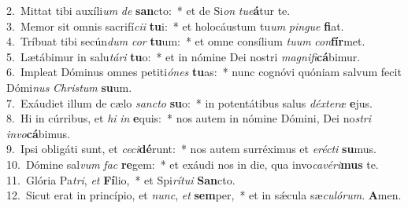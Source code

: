 {2.~}Mittat tibi auxíli\textit{um} \textit{de} \textbf{san}cto:~* et de Si\textit{on} \textit{tu}\textit{e}\textbf{á}tur te.\\
{3.~}Memor sit omnis sacrifí\textit{ci}\textit{i} \textbf{tu}i:~* et holocáustum tu\textit{um} \textit{pin}\textit{gue} \textbf{fi}at.\\
{4.~}Tríbuat tibi secún\textit{dum} \textit{cor} \textbf{tu}um:~* et omne consílium \textit{tu}\textit{um} \textit{con}\textbf{fír}met.\\
{5.~}Lætábimur in salu\textit{tá}\textit{ri} \textbf{tu}o:~* et in nómine Dei nostri \textit{ma}\textit{gni}\textit{fi}\textbf{cá}bimur.\\
{6.~}Impleat Dóminus omnes petiti\textit{ó}\textit{nes} \textbf{tu}as:~* nunc cognóvi quóniam salvum fecit Dómi\textit{nus} \textit{Chri}\textit{stum} \textbf{su}um.\\
{7.~}Exáudiet illum de cælo \textit{san}\textit{cto} \textbf{su}o:~* in potentátibus salus \textit{déx}\textit{te}\textit{ræ} \textbf{e}jus.\\
{8.~}Hi in cúrribus, et \textit{hi} \textit{in} \textbf{e}quis:~* nos autem in nómine Dómini, Dei no\textit{stri} \textit{in}\textit{vo}\textbf{cá}bimus.\\
{9.~}Ipsi obligáti sunt, et \textit{ce}\textit{ci}\textbf{dé}runt:~* nos autem surréximus et \textit{e}\textit{ré}\textit{cti} \textbf{su}mus.\\
{10.~}Dómine sal\textit{vum} \textit{fac} \textbf{re}gem:~* et exáudi nos in die, qua invo\textit{ca}\textit{vé}\textit{ri}\textbf{mus} te.\\
{11.~}Glória Pa\textit{tri}, \textit{et} \textbf{Fí}lio,~* et Spi\textit{rí}\textit{tu}\textit{i} \textbf{San}cto.\\
{12.~}Sicut erat in princípio, et \textit{nunc}, \textit{et} \textbf{sem}per,~* et in sǽcula sæ\textit{cu}\textit{ló}\textit{rum}. \textbf{A}men.\\

